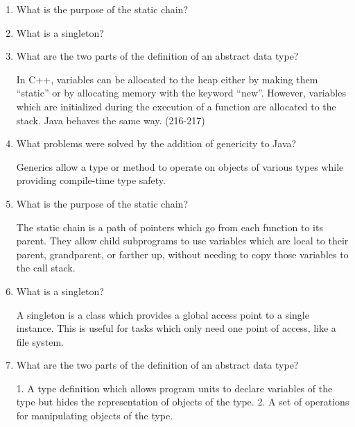 \begin{enumerate}
  \item What is the purpose of the static chain?

  \item What is a singleton?

  \item What are the two parts of the definition 
    of an abstract data type?

   \begin{answer}
    In C++, variables can be allocated to the heap either by making
    them “static” or by allocating memory with the keyword
    “new”. However, variables which are initialized during the
    execution of a function are allocated to the stack. Java behaves
    the same way. (216-217)
    \end{answer}

  \item What problems were solved by the addition
    of genericity to Java?

   \begin{answer}
    Generics allow a type or method to operate on objects of various
    types while providing compile-time type safety.
    \end{answer}

  \item What is the purpose of the static chain?

    \begin{answer}
    The static chain is a path of pointers which go from each function
    to its parent. They allow child subprograms to use variables which
    are local to their parent, grandparent, or farther up, without
    needing to copy those variables to the call stack.
    \end{answer}
  \item What is a singleton?

    \begin{answer}
    A singleton is a class which provides a global access point to a
    single instance. This is useful for tasks which only need one
    point of access, like a file system.
    \end{answer}

  \item What are the two parts of the definition 
    of an abstract data type?

   \begin{answer}
    1. A type definition which allows program units to declare
    variables of the type but hides the representation of objects of
    the type. 2. A set of operations for manipulating objects of the
    type.
    \end{answer}

  \end{enumerate}


